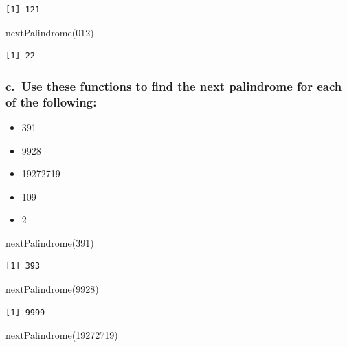 \documentclass[
  letterpaper,
  DIV=11,
  numbers=noendperiod]{scrartcl}
\newenvironment{Shaded}{\begin{snugshade}}{\end{snugshade}}
\newcommand{\DecValTok}[1]{\textcolor[rgb]{0.68,0.00,0.00}{#1}}
\newcommand{\FunctionTok}[1]{\textcolor[rgb]{0.28,0.35,0.67}{#1}}
\newcommand{\NormalTok}[1]{\textcolor[rgb]{0.00,0.23,0.31}{#1}}
\providecommand{\tightlist}{%
  \setlength{\itemsep}{0pt}\setlength{\parskip}{0pt}}\usepackage{longtable,booktabs,array}
\begin{document}
\begin{verbatim}
[1] 121
\end{verbatim}

\begin{Shaded}
\begin{Highlighting}[]
\FunctionTok{nextPalindrome}\NormalTok{(}\DecValTok{012}\NormalTok{)}
\end{Highlighting}
\end{Shaded}

\begin{verbatim}
[1] 22
\end{verbatim}

\subsubsection{c.~Use these functions to find the next palindrome for
each of the
following:}\label{c.-use-these-functions-to-find-the-next-palindrome-for-each-of-the-following}

\begin{itemize}
\tightlist
\item
  391
\item
  9928
\item
  19272719
\item
  109
\item
  2
\end{itemize}

\begin{Shaded}
\begin{Highlighting}[]
\FunctionTok{nextPalindrome}\NormalTok{(}\DecValTok{391}\NormalTok{)}
\end{Highlighting}
\end{Shaded}

\begin{verbatim}
[1] 393
\end{verbatim}

\begin{Shaded}
\begin{Highlighting}[]
\FunctionTok{nextPalindrome}\NormalTok{(}\DecValTok{9928}\NormalTok{)}
\end{Highlighting}
\end{Shaded}

\begin{verbatim}
[1] 9999
\end{verbatim}

\begin{Shaded}
\begin{Highlighting}[]
\FunctionTok{nextPalindrome}\NormalTok{(}\DecValTok{19272719}\NormalTok{)}
\end{Highlighting}
\end{Shaded}
\end{document}
